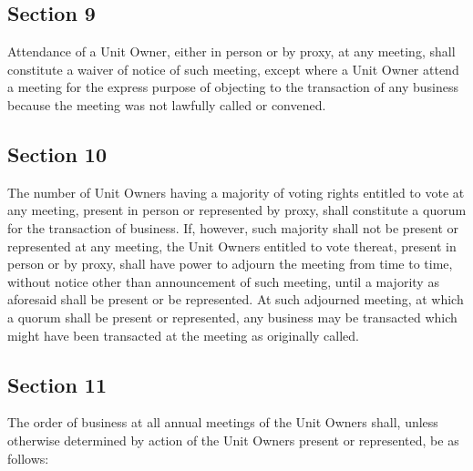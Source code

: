 \documentclass[
]{book}
\begin{document}
\hypertarget{section-9}{%
\subsection*{Section 9}\label{section-9}}

Attendance of a Unit Owner, either in person or by proxy, at any meeting, shall constitute a waiver of notice of such meeting, except where a Unit Owner attend a meeting for the express purpose of objecting to the transaction of any business because the meeting was not lawfully called or convened.

\hypertarget{section-10}{%
\subsection*{Section 10}\label{section-10}}

The number of Unit Owners having a majority of voting rights entitled to vote at any meeting, present in person or represented by proxy, shall constitute a quorum for the transaction of business. If, however, such majority shall not be present or represented at any meeting, the Unit Owners entitled to vote thereat, present in person or by proxy, shall have power to adjourn the meeting from time to time, without notice other than announcement of such meeting, until a majority as aforesaid shall be present or be represented. At such adjourned meeting, at which a quorum shall be present or represented, any business may be transacted which might have been transacted at the meeting as originally called.

\hypertarget{section-11}{%
\subsection*{Section 11}\label{section-11}}

The order of business at all annual meetings of the Unit Owners shall, unless otherwise determined by action of the Unit Owners present or represented, be as follows:
\end{document}
